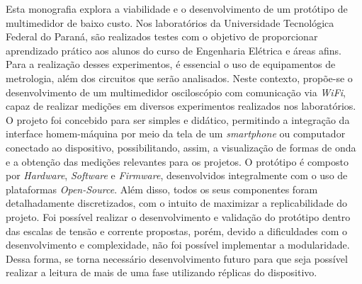 

\begin{resumoutfpr}%
Esta monografia explora a viabilidade e o desenvolvimento de um protótipo de multimedidor de baixo custo. Nos laboratórios da Universidade Tecnológica Federal do Paraná, são realizados testes com o objetivo de proporcionar aprendizado prático aos alunos do curso de Engenharia Elétrica e áreas afins. Para a realização desses experimentos, é essencial o uso de equipamentos de metrologia, além dos circuitos que serão analisados.
Neste contexto, propõe-se o desenvolvimento de um multimedidor osciloscópio com comunicação via \textit{WiFi}, capaz de realizar medições em diversos experimentos realizados nos laboratórios. O projeto foi concebido para ser simples e didático, permitindo a integração da interface homem-máquina por meio da tela de um \textit{smartphone} ou computador conectado ao dispositivo, possibilitando, assim, a visualização de formas de onda e a obtenção das medições relevantes para os projetos.
O protótipo é composto por \textit{Hardware}, \textit{Software} e \textit{Firmware}, desenvolvidos integralmente com o uso de plataformas \textit{Open-Source}. Além disso, todos os seus componentes foram detalhadamente discretizados, com o intuito de maximizar a replicabilidade do projeto.
Foi possível realizar o desenvolvimento e validação do protótipo dentro das escalas de tensão e corrente propostas, porém, devido a dificuldades com o desenvolvimento e complexidade, não foi possível implementar a modularidade. Dessa forma, se torna necessário desenvolvimento futuro para que seja possível realizar a leitura de mais de uma fase utilizando réplicas do dispositivo.
\end{resumoutfpr}
